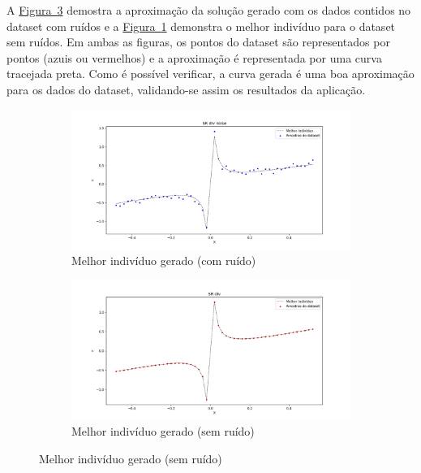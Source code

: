 \documentclass[a4paper]{article}
\begin{document}
A \hyperref[fig:best_sdn]{Figura~\ref*{fig:best_sdn}} demostra a aproximação da
solução gerado com os dados contidos no dataset com ruídos e a
\hyperref[fig:best_sd]{Figura~\ref*{fig:best_sd}} demonstra o melhor indivíduo
para o dataset sem ruídos. Em ambas as figuras, os pontos do dataset são
representados por pontos (azuis ou vermelhos) e a aproximação é representada por
uma curva tracejada preta. Como é possível verificar, a curva gerada é uma boa
aproximação para os dados do dataset, validando-se assim os resultados da
aplicação.

\begin{figure}[h]
  \caption{Demonstração de indivíduos gerados com ou sem ruído no dataset}
  \label{fig:demonstration}
  \begin{subfigure}[t]{0.5\textwidth}
    \includegraphics[width=\textwidth]{best_individual_noise}
    \caption{Melhor indivíduo gerado (com ruído)}
    \label{fig:best_sd}
  \end{subfigure}
  \begin{subfigure}[t]{0.5\textwidth}
    \includegraphics[width=\textwidth]{best_individual}
    \caption{Melhor indivíduo gerado (sem ruído)}
    \label{fig:best_sdn}
  \end{subfigure}
\end{figure}
\end{document}
